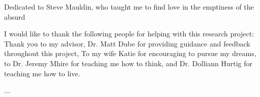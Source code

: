 \begin{dedication}
Dedicated to Steve Mauldin, who taught me to find love in the emptiness of the absurd 
\end{dedication}

\begin{acknowledgements}
I would like to thank the following people for helping with this research project:
Thank you to my advisor, Dr. Matt Dube for providing guidance and feedback throughout this project, To my wife Katie for encouraging to pursue my dreams, to Dr. Jeremy Mhire for teaching me how to think, and Dr. Dolliann Hurtig for teaching me how to live. 
\end{acknowledgements}

\tableofcontents
\listoftables				%
\listoffigures				%

\begin{thesislist}{...}		%
\end{thesislist}

\mainmatter

\endinput
